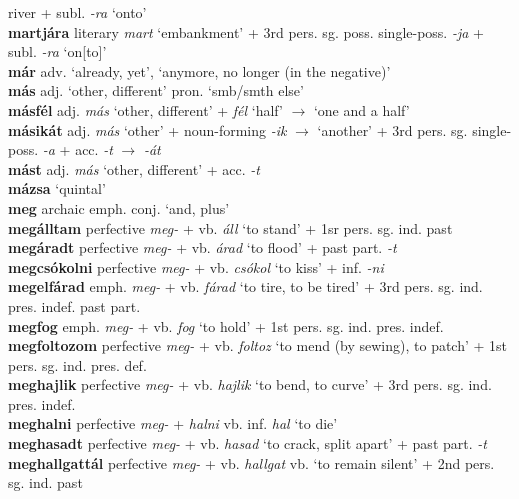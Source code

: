 \documentclass[11pt]{article}
\begin{document}
river + subl. \emph{-ra} `onto' \\
\textbf{martjára} literary \emph{mart} `embankment' + 3rd
pers. sg. poss. single\hyp{}poss. \emph{-ja} + subl. \emph{-ra}
`on[to]' \\
\textbf{már} adv. `already, yet', `anymore, no longer (in the
negative)' \\
\textbf{más} adj. `other, different' \textbar\textbar{}
pron. `smb/smth else' \\
\textbf{másfél} adj. \emph{más} `other, different' + \emph{fél} `half'
$\rightarrow$ `one and a half' \\
\textbf{másikát} adj. \emph{más} `other' +
noun\hyp{}forming \emph{-ik} $\rightarrow$ `another' + 3rd
  pers. sg. single\hyp{}poss. \emph{-a} + acc. \emph{-t}
  $\rightarrow$ \emph{-át} \\
\textbf{mást} adj. \emph{más} `other, different' + acc. \emph{-t} \\
\textbf{mázsa} `quintal' \\
\textbf{meg} archaic emph. \textbar\textbar{} conj. `and, plus' \\
\textbf{megálltam} perfective \emph{meg-} + vb. \emph{áll} `to
  stand' + 1sr pers. sg. ind. past \\
\textbf{megáradt} perfective \emph{meg-} + vb. \emph{árad} `to
flood' + past part. \emph{-t} \\
\textbf{megcsókolni} perfective \emph{meg-} +
vb. \emph{csókol} `to kiss' + inf. \emph{-ni} \\
\textbf{megelfárad} emph. \emph{meg-} + vb. \emph{fárad} `to
tire, to be tired' + 3rd
pers. sg. ind. pres. indef. \textbar\textbar{} past part. \\
\textbf{megfog} emph. \emph{meg-} + vb. \emph{fog} `to hold'
+ 1st pers. sg. ind. pres. indef. \\
\textbf{megfoltozom} perfective \emph{meg-} +
vb. \emph{foltoz} `to mend (by sewing), to patch' + 1st
pers. sg. ind. pres. def. \\
\textbf{meghajlik} perfective \emph{meg-} + vb. \emph{hajlik}
`to bend, to curve' + 3rd pers. sg. ind. pres. indef. \\
\textbf{meghalni} perfective  \emph{meg-} + \emph{halni}
vb. inf. \emph{hal} `to die' \\
\textbf{meghasadt} perfective \emph{meg-} + vb. \emph{hasad}
`to crack, split apart' + past part. \emph{-t} \\
\textbf{meghallgattál} perfective \emph{meg-}
+ vb. \emph{hallgat} vb. `to remain silent' + 2nd pers. sg. ind. past
\end{document}
